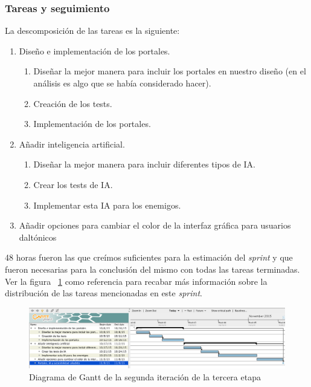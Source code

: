 \subsubsection{Tareas y seguimiento}

La descomposición de las tareas es la siguiente:

\begin{enumerate}[label=\bfseries WBS 2.\arabic*]
  \item Diseño e implementación de los portales.
    \begin{enumerate}[label=\bfseries WBS 2.1.\arabic*]
      \item Diseñar la mejor manera para incluir los portales en nuestro diseño (en el análisis es algo que se había considerado hacer).
      \item Creación de los tests.
      \item Implementación de los portales.
    \end{enumerate}
  \item Añadir inteligencia artificial.
  	\begin{enumerate}[label=\bfseries WBS 2.2.\arabic*]
      \item Diseñar la mejor manera para incluir diferentes tipos de IA.
      \item Crear los tests de IA.
      \item Implementar esta IA para los enemigos.
    \end{enumerate}
  \item Añadir opciones para cambiar el color de la interfaz gráfica para usuarios daltónicos
\end{enumerate}

48 horas fueron las que creímos suficientes para la estimación del \textit{sprint} y que fueron necesarias para la conclusión del mismo con todas las tareas terminadas. Ver la figura ~\ref{fig:sec3it2} como referencia para recabar más información sobre la distribución de las tareas mencionadas en este \textit{sprint}.

\begin{figure}
    \includegraphics[width=\textwidth,height=\textheight,keepaspectratio]{./img/sec3it2.png}
  \caption{Diagrama de Gantt de la segunda iteración de la tercera etapa}
  \label{fig:sec3it2}
\end{figure}

